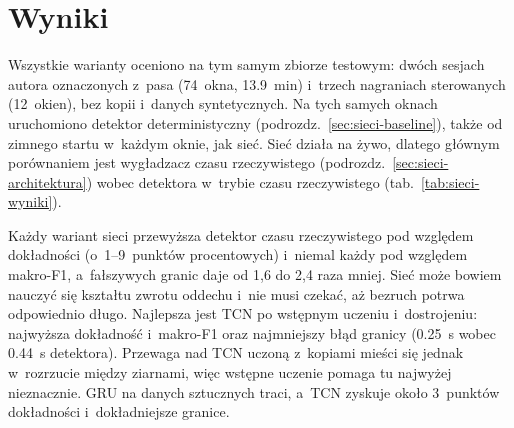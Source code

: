 \documentclass[12pt,a4paper,oneside]{report}
\begin{document}
\section{Wyniki}
\label{sec:sieci-wyniki}

Wszystkie warianty oceniono na tym samym zbiorze testowym: dwóch sesjach autora
oznaczonych z~pasa (74~okna, \SI{13.9}{min}) i~trzech nagraniach sterowanych
(12~okien), bez kopii i~danych syntetycznych. Na tych samych oknach uruchomiono
detektor deterministyczny (podrozdz.~\ref{sec:sieci-baseline}), także od zimnego startu
w~każdym oknie, jak sieć. Sieć działa na żywo, dlatego głównym porównaniem jest
wygładzacz czasu rzeczywistego (podrozdz.~\ref{sec:sieci-architektura}) wobec detektora
w~trybie czasu rzeczywistego (tab.~\ref{tab:sieci-wyniki}).

\begin{table}[H]
\centering
\small
\caption{Wyniki na zbiorze testowym w~czasie rzeczywistym: średnia z~trzech ziaren
losowych (dokładność $\pm$ odchylenie standardowe). Błąd granicy to średni błąd bezwzględny
wykrytych granic.}
\label{tab:sieci-wyniki}
\setlength{\tabcolsep}{4pt}
\end{table}

Każdy wariant sieci przewyższa detektor czasu rzeczywistego pod względem dokładności
(o~1--9~punktów procentowych) i~niemal każdy pod względem makro-F1, a~fałszywych granic
daje od 1,6 do 2,4 raza mniej. Sieć może bowiem nauczyć się kształtu zwrotu oddechu
i~nie musi czekać, aż bezruch potrwa odpowiednio długo. Najlepsza jest TCN po wstępnym
uczeniu i~dostrojeniu: najwyższa dokładność i~makro-F1 oraz najmniejszy błąd granicy
(\SI{0.25}{s} wobec \SI{0.44}{s} detektora). Przewaga nad TCN uczoną z~kopiami mieści się
jednak w~rozrzucie między ziarnami, więc wstępne uczenie pomaga tu najwyżej nieznacznie.
GRU na danych sztucznych traci, a~TCN zyskuje około 3~punktów dokładności i~dokładniejsze
granice.
\end{document}
